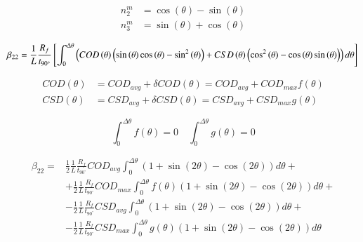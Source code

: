 \documentclass[review]{elsarticle}
\begin{document}
\begin{equation}
\begin{aligned}
n_{2}^{m}&=\cos{\left(\theta\right)}-\sin{\left(\theta\right)}\\
n_{3}^{m}&=\sin{\left(\theta\right)}+\cos{\left(\theta\right)}
\end{aligned}
\end{equation}

\begin{equation}
\beta_{22}=\frac{1}{L}\frac{R_{f}}{t_{90^{\circ}}}\left[\int_{0}^{\Delta\theta}\left(COD\left(\theta\right)\left(\sin{\left(\theta\right)}\cos{\left(\theta\right)}-\sin^{2}{\left(\theta\right)}\right)+CSD\left(\theta\right)\left(\cos^{2}{\left(\theta\right)}-\cos{\left(\theta\right)}\sin{\left(\theta\right)}\right)\right)d\theta\right]\\
\end{equation}

\begin{equation}
\begin{aligned}
COD\left(\theta\right)&=COD_{avg}+\delta COD\left(\theta\right)=COD_{avg}+COD_{max}f\left(\theta\right)\\
CSD\left(\theta\right)&=CSD_{avg}+\delta CSD\left(\theta\right)=CSD_{avg}+CSD_{max}g\left(\theta\right)
\end{aligned}
\end{equation}

\begin{equation}
\int_{0}^{\Delta\theta}f\left(\theta\right)=0\quad\int_{0}^{\Delta\theta}g\left(\theta\right)=0
\end{equation}

\begin{equation}
\begin{aligned}
\beta_{22}=&\frac{1}{2}\frac{1}{L}\frac{R_{f}}{t_{90^{\circ}}}COD_{avg}\int_{0}^{\Delta\theta}\left(1+\sin\left(2\theta\right)-\cos\left(2\theta\right)\right)d\theta+\\
&+\frac{1}{2}\frac{1}{L}\frac{R_{f}}{t_{90^{\circ}}}COD_{max}\int_{0}^{\Delta\theta}f\left(\theta\right)\left(1+\sin\left(2\theta\right)-\cos\left(2\theta\right)\right)d\theta+\\
&-\frac{1}{2}\frac{1}{L}\frac{R_{f}}{t_{90^{\circ}}}CSD_{avg}\int_{0}^{\Delta\theta}\left(1+\sin\left(2\theta\right)-\cos\left(2\theta\right)\right)d\theta+\\
&-\frac{1}{2}\frac{1}{L}\frac{R_{f}}{t_{90^{\circ}}}CSD_{max}\int_{0}^{\Delta\theta}g\left(\theta\right)\left(1+\sin\left(2\theta\right)-\cos\left(2\theta\right)\right)d\theta\\
\end{aligned}
\end{equation}
\end{document}
